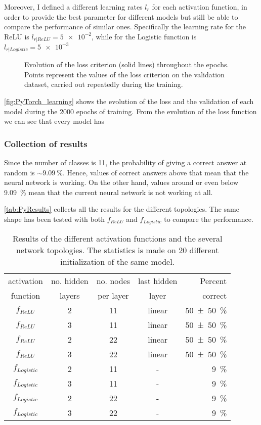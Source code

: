 Moreover, I defined a different learning rates $l_r$ for each activation function, in order to provide the best parameter for different models but still be able to compare the performance of similar ones.
Specifically the learning rate for the \acs{ReLU} is $l_{r|ReLU} = \num{5e-2}$, while for the Logistic function is $l_{r|Logistic}= \num{5e-3}$

\begin{figure}[htbp]
	\centering
	
	\caption{Evolution of the loss criterion (solid lines) throughout the epochs.
		Points represent the values of the loss criterion on the validation dataset, carried out repeatedly during the training.
	}
	\label{fig:PyTorch_learning}
\end{figure}

\autoref{fig:PyTorch_learning} shows the evolution of the loss and the validation of each model during the \num{2000} epochs of training.
From the evolution of the loss function we can see that every model has 


\subsubsection{Collection of results}
Since the number of classes is \num{11}, the probability of giving a correct answer at random is $\sim \SI{9.09}{\percent}$.
Hence, values of correct answers above that mean that the neural network is working.
On the other hand, values around or even below \SI{9.09}{\percent} mean that the current neural network is not working at all.

\autoref{tab:PyResults} collects all the results for the different topologies.
The same shape has been tested with both $f_{ReLU}$ and $f_{Logistic}$ to compare the performance.

\begin{table}[htbp]
	\centering
	\begin{tabular}{c c c c r}
	\toprule
	activation	& no. hidden 	& no. nodes	& last hidden	& Percent \\
	function		& layers 			& per layer	& layer				& correct \\
	\midrule
	$f_{ReLU}$ 			& 2 & 11 & linear & \SI{50 +- 50}{\percent} \\
	$f_{ReLU}$ 			& 3 & 11 & linear & \SI{50 +- 50}{\percent} \\
	$f_{ReLU}$ 			& 2 & 22 & linear & \SI{50 +- 50}{\percent} \\
	$f_{ReLU}$ 			& 3 & 22 & linear & \SI{50 +- 50}{\percent} \\
	$f_{Logistic}$ 	& 2 & 11 & - & \SI{9}{\percent} \\
	$f_{Logistic}$ 	& 3 & 11 & - & \SI{9}{\percent} \\
	$f_{Logistic}$ 	& 2 & 22 & - & \SI{9}{\percent} \\
	$f_{Logistic}$ 	& 3 & 22 & - & \SI{9}{\percent} \\
	\bottomrule
	\end{tabular}
	\caption{Results of the different activation functions and the several network topologies.
	The statistics is made on \num{20} different initialization of the same model.
	}
	\label{tab:PyResults}
\end{table}

